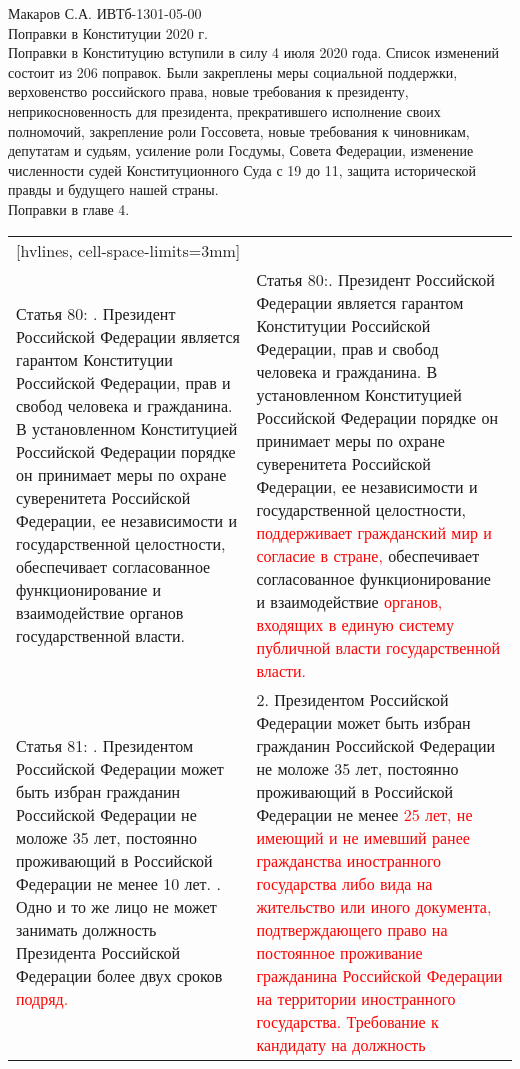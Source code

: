 \documentclass[a4paper,14pt]{extarticle}
\begin{document}
	\pagestyle{empty}
	\noindent Макаров С.А. ИВТб-1301-05-00\\
	Поправки в Конституции 2020 г.\\
	
	Поправки в Конституцию вступили в силу 4 июля 2020 года. Список изменений состоит из 206 поправок. Были закреплены меры социальной поддержки, верховенство российского права, новые требования к президенту, неприкосновенность для президента, прекратившего исполнение своих полномочий, закрепление роли Госсовета, новые требования к чиновникам, депутатам и судьям, усиление роли Госдумы, Совета Федерации, изменение численности судей Конституционного Суда с 19 до 11, защита исторической правды и будущего нашей страны.\\
	
	Поправки в главе 4. \\
	
	\noindent
	\begin{NiceTabular}{p{92mm}p{91mm}}[hvlines, cell-space-limits=3mm]
		 &  \\
		
		Статья 80: . Президент Российской Федерации является гарантом Конституции Российской Федерации, прав и свобод человека и гражданина. В установленном Конституцией Российской Федерации порядке он принимает меры по охране суверенитета Российской Федерации, ее независимости и государственной целостности, обеспечивает согласованное функционирование и взаимодействие органов государственной власти. &
		Статья 80:. Президент Российской Федерации является гарантом Конституции Российской Федерации, прав и свобод человека и гражданина. В установленном Конституцией Российской Федерации порядке он принимает меры по охране суверенитета Российской Федерации, ее независимости и государственной целостности, \textcolor{red}{поддерживает
		гражданский мир и согласие в стране,} обеспечивает согласованное функционирование и взаимодействие \textcolor{red}{органов, входящих в единую систему публичной власти государственной власти.} \\
		
		Статья 81: . Президентом Российской Федерации может быть избран гражданин Российской Федерации не моложе 35 лет, постоянно проживающий в Российской Федерации не менее 10 лет. . Одно и то же лицо не может занимать должность Президента Российской Федерации более двух сроков \textcolor{red}{подряд.} &
		2. Президентом Российской Федерации может быть избран гражданин Российской Федерации не моложе 35 лет, постоянно проживающий в Российской Федерации не менее \textcolor{red}{25 лет, не имеющий и не имевший ранее гражданства иностранного государства либо вида на жительство или иного документа, подтверждающего право на постоянное проживание гражданина Российской Федерации на территории иностранного государства. Требование к кандидату на должность}
	\end{NiceTabular}
	
\end{document}

